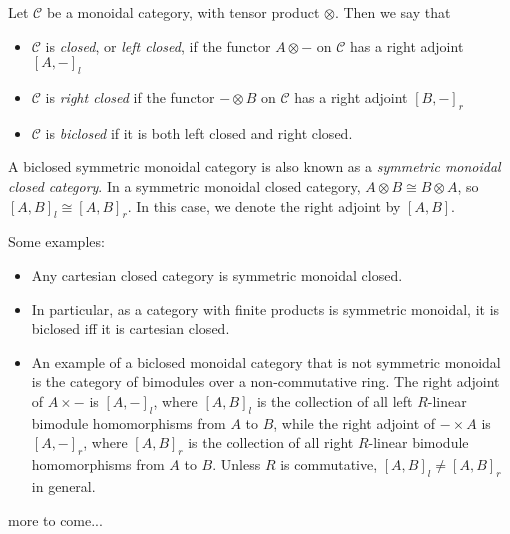 \documentclass[12pt]{article}
\begin{document}

Let $\mathcal{C}$ be a monoidal category, with tensor product $\otimes$.  Then we say that 

\begin{itemize}
\item $\mathcal{C}$ is \emph{closed}, or \emph{left closed}, if the functor $A\otimes -$ on $\mathcal{C}$ has a right adjoint $[A,-]_l$
\item $\mathcal{C}$ is \emph{right closed} if the functor $-\otimes B$ on $\mathcal{C}$ has a right adjoint $[B,-]_r$
\item $\mathcal{C}$ is \emph{biclosed} if it is both left closed and right closed.
\end{itemize}

A biclosed symmetric monoidal category is also known as a \emph{symmetric monoidal closed category}.  In a symmetric monoidal closed category, $A\otimes B\cong B\otimes A$, so $[A, B]_l \cong [A,B]_r$.  In this case, we denote the right adjoint by $[A,B]$.

Some examples:
\begin{itemize}
\item Any cartesian closed category is symmetric monoidal closed.  
\item In particular, as a category with finite products is symmetric monoidal, it is biclosed iff it is cartesian closed.  
\item An example of a biclosed monoidal category that is not symmetric monoidal is the category of bimodules over a non-commutative ring.  The right adjoint of $A\times -$ is $[A,-]_l$, where $[A,B]_l$ is the collection of all left $R$-linear bimodule homomorphisms from $A$ to $B$, while the right adjoint of $-\times A$ is $[A,-]_r$, where $[A,B]_r$ is the collection of all right $R$-linear bimodule homomorphisms from $A$ to $B$.  Unless $R$ is commutative, $[A,B]_l \ne [A,B]_r$ in general.
\end{itemize}

more to come...
\end{document}
